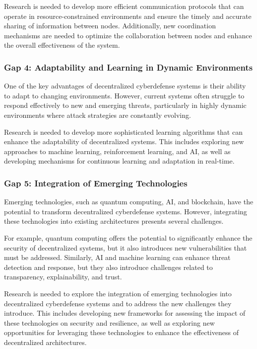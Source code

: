 Research is needed to develop more efficient communication protocols that can operate in resource-constrained environments and ensure the timely and accurate sharing of information between nodes. Additionally, new coordination mechanisms are needed to optimize the collaboration between nodes and enhance the overall effectiveness of the system.

\subsubsection{Gap 4: Adaptability and Learning in Dynamic Environments}

One of the key advantages of decentralized cyberdefense systems is their ability to adapt to changing environments. However, current systems often struggle to respond effectively to new and emerging threats, particularly in highly dynamic environments where attack strategies are constantly evolving.

Research is needed to develop more sophisticated learning algorithms that can enhance the adaptability of decentralized systems. This includes exploring new approaches to machine learning, reinforcement learning, and AI, as well as developing mechanisms for continuous learning and adaptation in real-time.

\subsubsection{Gap 5: Integration of Emerging Technologies}

Emerging technologies, such as quantum computing, AI, and blockchain, have the potential to transform decentralized cyberdefense systems. However, integrating these technologies into existing architectures presents several challenges.

For example, quantum computing offers the potential to significantly enhance the security of decentralized systems, but it also introduces new vulnerabilities that must be addressed. Similarly, AI and machine learning can enhance threat detection and response, but they also introduce challenges related to transparency, explainability, and trust.

Research is needed to explore the integration of emerging technologies into decentralized cyberdefense systems and to address the new challenges they introduce. This includes developing new frameworks for assessing the impact of these technologies on security and resilience, as well as exploring new opportunities for leveraging these technologies to enhance the effectiveness of decentralized architectures.

